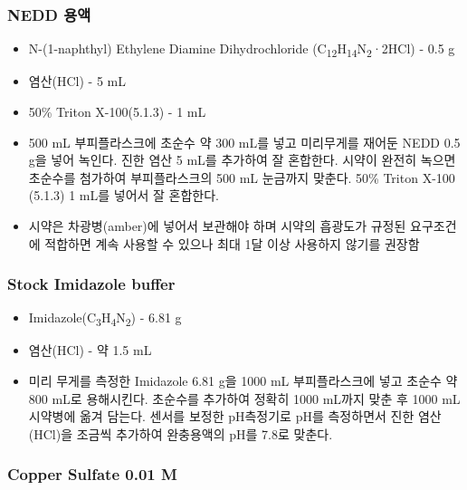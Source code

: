 \documentclass[
]{book}
\providecommand{\tightlist}{%
  \setlength{\itemsep}{0pt}\setlength{\parskip}{0pt}}
\begin{document}
\hypertarget{nedd-uxc6a9uxc561}{%
\subsubsection{NEDD 용액}\label{nedd-uxc6a9uxc561}}

\begin{itemize}
\tightlist
\item
  N-(1-naphthyl) Ethylene Diamine Dihydrochloride (C\textsubscript{12}H\textsubscript{14}N\textsubscript{2}·2HCl) - 0.5 g\\
\item
  염산(HCl) - 5 mL
\item
  50\% Triton X-100(5.1.3) - 1 mL
\item
  500 mL 부피플라스크에 초순수 약 300 mL를 넣고 미리무게를 재어둔 NEDD 0.5 g을 넣어 녹인다. 진한 염산 5 mL를 추가하여 잘 혼합한다. 시약이 완전히 녹으면 초순수를 첨가하여 부피플라스크의 500 mL 눈금까지 맞춘다. 50\% Triton X-100 (5.1.3) 1 mL를 넣어서 잘 혼합한다.
\item
  시약은 차광병(amber)에 넣어서 보관해야 하며 시약의 흡광도가 규정된 요구조건에 적합하면 계속 사용할 수 있으나 최대 1달 이상 사용하지 않기를 권장함
\end{itemize}

\hypertarget{stock-imidazole-buffer}{%
\subsubsection{Stock Imidazole buffer}\label{stock-imidazole-buffer}}

\begin{itemize}
\tightlist
\item
  Imidazole(C\textsubscript{3}H\textsubscript{4}N\textsubscript{2}) - 6.81 g\\
\item
  염산(HCl) - 약 1.5 mL
\item
  미리 무게를 측정한 Imidazole 6.81 g을 1000 mL 부피플라스크에 넣고 초순수 약 800 mL로 용해시킨다. 초순수를 추가하여 정확히 1000 mL까지 맞춘 후 1000 mL 시약병에 옮겨 담는다. 센서를 보정한 pH측정기로 pH를 측정하면서 진한 염산(HCl)을 조금씩 추가하여 완충용액의 pH를 7.8로 맞춘다.
\end{itemize}

\hypertarget{copper-sulfate-0.01-m}{%
\subsubsection{Copper Sulfate 0.01 M}\label{copper-sulfate-0.01-m}}
\end{document}
